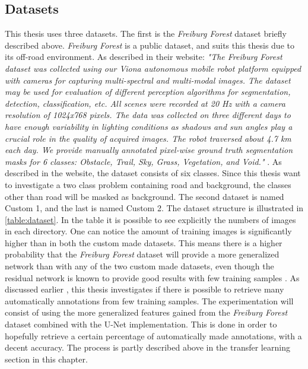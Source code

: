 \documentclass[USenglish]{ifimaster}  %
\begin{document}
\subsection{Datasets}
This thesis uses three datasets. The first is the \textit{Freiburg Forest} dataset briefly described above. \textit{Freiburg Forest} is a public dataset, and suits this thesis due to its off-road environment. As described in their website:
\newline
\newline
\textit{"The Freiburg Forest dataset was collected using our Viona autonomous mobile robot platform equipped with cameras for capturing multi-spectral and multi-modal images. The dataset may be used for evaluation of different perception algorithms for segmentation, detection, classification, etc. All scenes were recorded at 20 Hz with a camera resolution of 1024x768 pixels. The data was collected on three different days to have enough variability in lighting conditions as shadows and sun angles play a crucial role in the quality of acquired images. The robot traversed about 4.7 km each day. We provide manually annotated pixel-wise ground truth segmentation masks for 6 classes: Obstacle, Trail, Sky, Grass, Vegetation, and Void."} \cite{website:deepscene_freiburg_forest_website}. 
\newline
\newline
As described in the website, the dataset consists of six classes. Since this thesis want to investigate a two class problem containing road and background, the classes other than road will be masked as background. The second dataset is named Custom 1, and the last is named Custom 2. The dataset structure is illustrated in \cref{table:dataset}. In the table it is possible to see explicitly the numbers of images in each directory. One can notice the amount of training images is significantly higher than in both the custom made datasets. This means there is a higher probability that the \textit{Freiburg Forest} dataset will provide a more generalized network than with any of the two custom made datasets, even though the residual network is known to provide good results with few training samples \cite{website:u_net_article}. As discussed earlier , this thesis investigates if there is possible to retrieve many automatically annotations from few training samples. The experimentation will consist of using the more generalized features gained from the \textit{Freiburg Forest} dataset combined with the U-Net implementation. This is done in order to hopefully retrieve a certain percentage of automatically made annotations, with a decent accuracy. The process is partly described above in the transfer learning section in this chapter.
\end{document}
